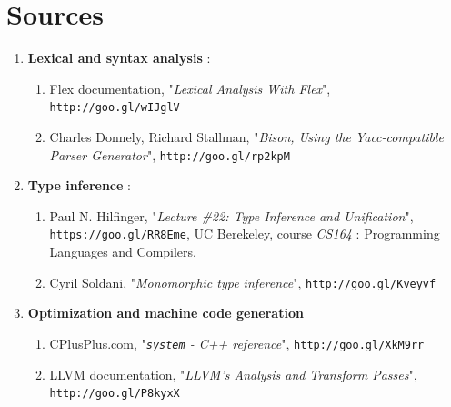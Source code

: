 \documentclass[a4paper,11pt]{article}
\begin{document}
\section{Sources}
\begin{enumerate}
	\item \textbf{Lexical and syntax analysis} : 
	\begin{enumerate}
		\item\label{enum:flex_ref} Flex documentation, "\textit{Lexical Analysis With Flex}", \texttt{http://goo.gl/wIJglV}
		\item\label{enum:bison_ref} Charles Donnely, Richard Stallman, "\textit{Bison, Using the Yacc-compatible Parser Generator}", \texttt{http://goo.gl/rp2kpM} 
	\end{enumerate}
	\item \textbf{Type inference} : 
	\begin{enumerate}
		\item\label{enum:inference_unification} Paul N. Hilfinger, "\textit{Lecture \#22: Type Inference and Unification}", \texttt{https://goo.gl/RR8Eme}, UC Berekeley, course \textit{CS164} : Programming Languages and Compilers.
		\item\label{enum:inference_photon} Cyril Soldani, "\textit{Monomorphic type inference}", \texttt{http://goo.gl/Kveyvf}
	\end{enumerate}
	\item \textbf{Optimization and machine code generation}
	\begin{enumerate}
		\item\label{enum:system_cmd_proc} CPlusPlus.com, "\textit{\texttt{system} - C++ reference}", \texttt{http://goo.gl/XkM9rr}
		\item\label{enum:opt_passes} LLVM documentation, "\textit{LLVM’s Analysis and Transform Passes}", \texttt{http://goo.gl/P8kyxX}
	\end{enumerate}
\end{enumerate}
\end{document}
